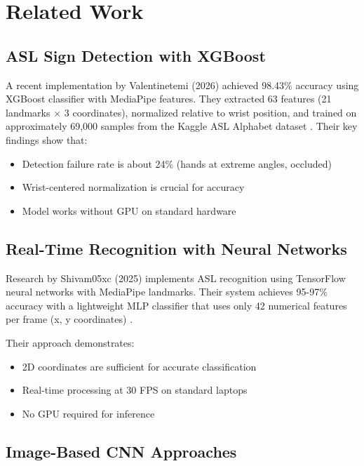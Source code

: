 \vspace{1em}
\section{Related Work}

\subsection{ASL Sign Detection with XGBoost}

A recent implementation by Valentinetemi (2026) achieved 98.43\% accuracy using XGBoost classifier with MediaPipe features. They extracted 63 features (21 landmarks $\times$ 3 coordinates), normalized relative to wrist position, and trained on approximately 69,000 samples from the Kaggle ASL Alphabet dataset \cite{Valentinetemi}. Their key findings show that:
\begin{itemize}
    \item Detection failure rate is about 24\% (hands at extreme angles, occluded)
    \item Wrist-centered normalization is crucial for accuracy
    \item Model works without GPU on standard hardware
\end{itemize}

\subsection{Real-Time Recognition with Neural Networks}

Research by Shivam05xc (2025) implements ASL recognition using TensorFlow neural networks with MediaPipe landmarks. Their system achieves 95-97\% accuracy with a lightweight MLP classifier that uses only 42 numerical features per frame (x, y coordinates) \cite{shivam2025}.

Their approach demonstrates:
\begin{itemize}
    \item 2D coordinates are sufficient for accurate classification
    \item Real-time processing at 30 FPS on standard laptops
    \item No GPU required for inference
\end{itemize}

\subsection{Image-Based CNN Approaches}

